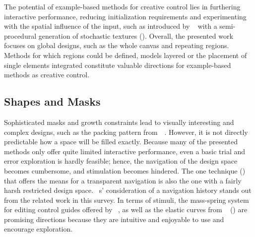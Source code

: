 The potential of example-based methods for creative control lies in furthering interactive performance, reducing initialization requirements and experimenting with the spatial influence of the input, such as introduced by \citeauthor*{guehl_2020_stu}~\cite{guehl_2020_stu} with a semi-procedural generation of stochastic textures (). Overall, the presented work focuses on global designs, such as the whole canvas and repeating regions. Methods for which regions could be defined, models layered or the placement of single elements integrated constitute valuable directions for example-based methods as creative control.



\subsection{Shapes and Masks}
\label{subsubsec:analysis_creative_means_shapes}

Sophisticated masks and growth constraints lead to visually interesting and complex designs, such as the packing pattern from~\citeauthor*{saputra_2018_rde}~\cite{saputra_2018_rde}. However, it is not directly predictable how a space will be filled exactly. Because many of the presented methods only offer quite limited interactive performance, even a basic trial and error exploration is hardly feasible; hence, the navigation of the design space becomes cumbersome, and stimulation becomes hindered. The one technique (\cite{santoni_2016_ggp}) that offers the means for a transparent navigation is also the one with a fairly harsh restricted design space. \citeauthor*{santoni_2016_ggp}~\cite{santoni_2016_ggp}s' consideration of a navigation history stands out from the related work in this survey. In terms of stimuli, the mass-spring system for editing control guides offered by \citeauthor*{benes_2011_gpm}~\cite{benes_2011_gpm}, as well as the elastic curves from \citeauthor*{zehnder_2016_dso}~\cite{zehnder_2016_dso} () are promising directions because they are intuitive and enjoyable to use and encourage exploration. 

